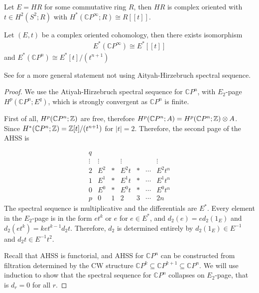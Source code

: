 \begin{example}
    Let $E=HR$ for some commutative ring $R$, then $HR$ is complex oriented with $t\in H^2(S^2; R)$ with $H^*(\mathbb{C}P^∞;R)\cong R[[t]]$.
\end{example}
\begin{theorem}
    \cite{PreRavenelGreen}\cite{PreAdams} \cite{ChrHopkins}
    Let $(E, t)$ be a complex oriented cohomology, then there exists isomorphism
    \begin{align*}
        E^*(\mathbb{C}P^∞)\cong E^*[[t]]
    \end{align*}and $  E^*(\mathbb{C}P^n)\cong E^*[t]/(t^{n+1})$
\end{theorem}
See \cite{ChrLurie} for a more general statement not using Aityah-Hirzebruch spectral sequence.
\begin{proof}
    We use the Atiyah-Hirzebruch spectral sequence for $\mathbb{C}P^n$, with $E_2$-page $H^p(\mathbb{C}P^n; E^q)$, which is strongly convergent as $\mathbb{C}P^n$ is finite.  

    First of all, $H^p(\mathbb{C}P^n; \mathbb{Z})$ are free, therefore $H^p(\mathbb{C}P^n; A)=H^p(\mathbb{C}P^n; \mathbb{Z}) \otimes A$. Since $H^*(\mathbb{C}P^n; \mathbb{Z})=\mathbb{Z}[t]/(t^{n+1})$ for $|t|=2$. Therefore, the second page of the AHSS is
  
\[
\begin{array}{c|cccccc}
q & \\
\vdots & \vdots & & \vdots & & & \vdots \\
2 & E^{2} & * & E^{2}t & * & \cdots & E^{2}t^n \\
1 & E^{1} & * & E^{1}t & * & \cdots & E^{1}t^n \\
0 & E^{0} & * & E^{0}t & * & \cdots & E^{0}t^n \\
\hline
p & 0 & 1 & 2 & 3 & \cdots & 2n
\end{array}
\]
    The spectral sequence is multiplicative and the differentials are $E^*$. Every element in the $E_2$-page is in the form $et^k$ or $e$ for $e\in E^*$, and $d_2(e)=ed_2(1_E)$ and $d_2(et^k)=ket^{k-1}d_2t$. Therefore, $d_2$ is determined entirely by $d_2(1_E)\in E^{-1}$ and $d_2t\in E^{-1} t^2$.

    Recall that AHSS is functorial, and AHSS for $\mathbb{C}P^n$ can be constructed from filtration determined by the CW structure $\mathbb{C}P^k\subseteq \mathbb{C}P^{k+1}\subseteq \mathbb{C}P^n$. We will use induction to show that the spectral sequence for $\mathbb{C}P^n$ collapses on $E_2$-page, that is $d_r=0$ for all $r$. 
    

\end{proof}
